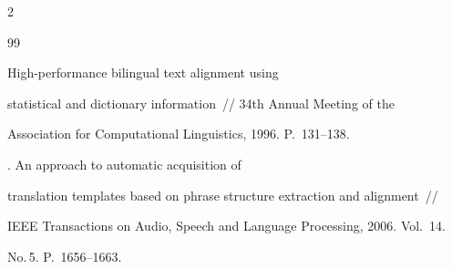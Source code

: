 \begin{multicols}{2}
{{\begin{thebibliography}{99}
{}




 High-performance bilingual text alignment using 


statistical and dictionary information~// 34th Annual Meeting of the 


Association for Computational Linguistics, 1996. P.~131--138. 


{%





}




. An approach to automatic acquisition of 


translation templates based on phrase structure extraction and alignment~// 


IEEE Transactions on Audio, Speech and Language Processing, 2006. Vol.~14. 


No.\,5. P.~1656--1663. 


{





}


\end{thebibliography}





}


}








\end{multicols}





\label{end\stat}


